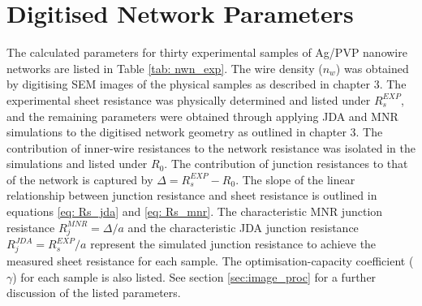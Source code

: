 \chapter{Digitised Network Parameters}
\label{appendix: experiment nwn}
The calculated parameters for thirty experimental samples of Ag/PVP nanowire networks are listed in Table \ref{tab: nwn_exp}\cite{rocha2015}. The wire density ($n_w$) was obtained by digitising SEM images of the physical samples as described in chapter 3. The experimental sheet resistance was physically determined and listed under $R_s^{EXP}$, and the remaining parameters were obtained through applying JDA and MNR simulations to the digitised network geometry as outlined in chapter 3. The contribution of inner-wire resistances to the network resistance was isolated in the simulations and listed under $R_0$. The contribution of junction resistances to that of the network is captured by $\Delta = R_s^{EXP} - R_0$. The slope of the linear relationship between junction resistance and sheet resistance is outlined in equations \ref{eq: Rs_jda} and \ref{eq: Rs_mnr}. The characteristic MNR junction resistance $R_j^{MNR} = \Delta/a$ and the characteristic JDA junction resistance $R_j^{JDA} = R_s^{EXP}/a$ represent the simulated junction resistance to achieve the measured sheet resistance for each sample. The optimisation-capacity coefficient ($\gamma$) for each sample is also listed. See section \ref{sec:image_proc} for a further discussion of the listed parameters.

